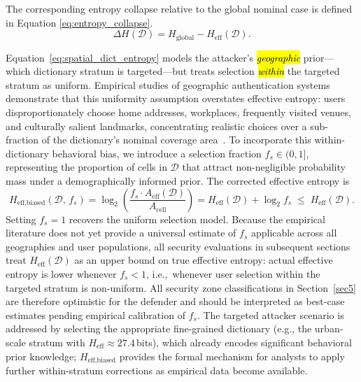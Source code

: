\documentclass[mathematics,article,accept,pdftex,moreauthors]{Definitions/mdpi}
\begin{document}
The corresponding entropy collapse relative to the global nominal case is defined in Equation \eqref{eq:entropy_collapse}.
\begin{equation}
\Delta H(\mathcal{D}) = H_{\text{global}} - H_{\text{eff}}(\mathcal{D}).
\label{eq:entropy_collapse}
\end{equation}

{Equation~\eqref{eq:spatial_dict_entropy} models the attacker's \emph{\hl{geographic}} prior---which dictionary stratum is targeted---but treats selection \emph{\hl{within}} the targeted stratum as uniform. Empirical studies of geographic authentication systems demonstrate that this uniformity assumption overstates effective entropy: users disproportionately choose home addresses, workplaces, frequently visited venues, and culturally salient landmarks, concentrating realistic choices over a sub-fraction of the dictionary's nominal coverage area~\cite{Sun2012,Thorpe2013,AlAmeen2014}. To incorporate this within-dictionary behavioral bias, we introduce a selection fraction $f_s \in (0,1]$, representing the proportion of cells in $\mathcal{D}$ that attract non-negligible probability mass under a demographically informed prior. The corrected effective entropy is
\begin{equation}
H_{\text{eff,biased}}(\mathcal{D},\,f_s)
  = \log_2\!\left(\frac{f_s \cdot A_{\text{eff}}(\mathcal{D})}{A_{\text{cell}}}\right)
  = H_{\text{eff}}(\mathcal{D}) + \log_2 f_s \;\leq\; H_{\text{eff}}(\mathcal{D}).
\label{eq:biased_entropy}
\end{equation}
Setting $f_s = 1$ recovers the uniform selection model. Because the empirical literature does not yet provide a universal estimate of $f_s$ applicable across all geographies and user populations, all security evaluations in subsequent sections treat $H_{\text{eff}}(\mathcal{D})$ as an upper bound on true effective entropy: actual effective entropy is lower whenever $f_s < 1$, i.e.,\ whenever user selection within the targeted stratum is non-uniform. All security zone classifications in Section~\ref{sec5} are therefore optimistic for the defender and should be interpreted as best-case estimates pending empirical calibration of $f_s$. The targeted attacker scenario is addressed by selecting the appropriate fine-grained dictionary (e.g., the urban-scale stratum with $H_{\text{eff}} \approx 27.4$\,bits), which already encodes significant behavioral prior knowledge; $H_{\text{eff,biased}}$ provides the formal mechanism for analysts to apply further within-stratum corrections as empirical data become available.}
\end{document}
